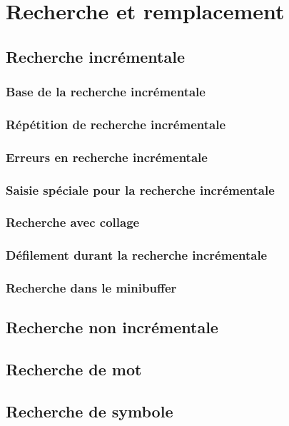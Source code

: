 \chapter{Recherche et remplacement}
\section{Recherche incrémentale}
\subsection{Base de la recherche incrémentale}
\subsection{Répétition de recherche incrémentale}
\subsection{Erreurs en recherche incrémentale}
\subsection{Saisie spéciale pour la recherche
  incrémentale} 
\subsection{Recherche avec collage}
\subsection{Défilement durant la recherche
  incrémentale} 
\subsection{Recherche dans le minibuffer}
\section{Recherche non incrémentale}
\section{Recherche de mot}
\section{Recherche de symbole}
